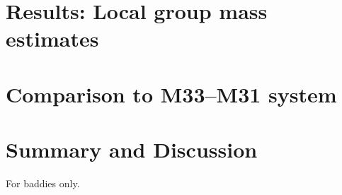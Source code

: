 \documentclass[modern]{aastex631}
\begin{document}
\section{Results: Local group mass estimates}
\label{sec:results}


\section{Comparison to M33--M31 system}
\label{sec:results}


\section{Summary and Discussion}
\label{sec:discussion}



\appendix
For baddies only.

{}

\end{document}
